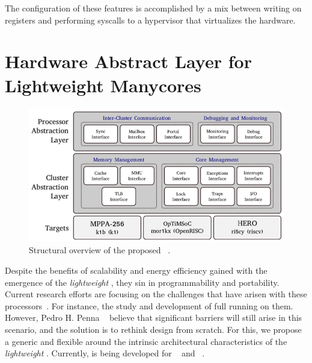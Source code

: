 		The configuration of these features is accomplished by a mix between
		writing on \dma registers and performing syscalls to a hypervisor
		that virtualizes the \mppa hardware.	

\section{Hardware Abstract Layer for Lightweight Manycores}
\label{sec.hal}


	\begin{figure}[h]
		\centering
		\includegraphics[width=.9\textwidth]{images/hal-struct.png}

		\caption{
			Structural overview of the proposed \hal~\cite{penna:compas2019}.
		}\par
		\label{fig.hal-struct}
	\end{figure}
	
	Despite the benefits of scalability and energy efficiency gained with the
	emergence of the \textit{lightweight \manycores}, they sin in programmability
	and portability.
	Current research efforts are focusing on the challenges that have arisen with
	these processors~\cite{christgau2017, gamell2012, serres2011}.
	For instance, the study and development of full \oses running on them.
	However, Pedro H. Penna \etal~\cite{penna:compas19, penna2019} believe that significant barriers will still
	arise in this scenario, and the solution is to rethink \os design from scratch.
	For this, we propose a generic and flexible \hal around the intrinsic
	architectural characteristics of the \textit{lightweight \manycores}.
	Currently, \hal is being developed for \mppa~\cite{DeDinechin2013-1} and
	\optimsoc~\cite{Wallentowitz2013}.

